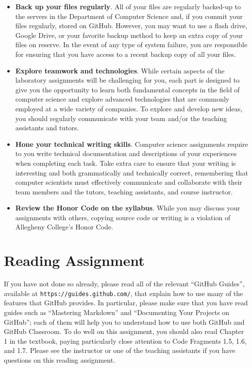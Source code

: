 \documentclass[11pt]{article}
\newcommand{\url}[1]{\lstinline{#1}}
\begin{document}
\begin{itemize}
\item {\bf Back up your files regularly}. All of your files are regularly
  backed-up to the servers in the Department of Computer Science and, if you
  commit your files regularly, stored on GitHub. However, you may want to use a
  flash drive, Google Drive, or your favorite backup method to keep an extra
  copy of your files on reserve. In the event of any type of system failure, you
  are responsible for ensuring that you have access to a recent backup copy of
  all your files.

\item {\bf Explore teamwork and technologies}. While certain aspects of the
  laboratory assignments will be challenging for you, each part is designed to
  give you the opportunity to learn both fundamental concepts in the field of
  computer science and explore advanced technologies that are commonly employed
  at a wide variety of companies. To explore and develop new ideas, you should
  regularly communicate with your team and/or the teaching assistants and
  tutors.

\item {\bf Hone your technical writing skills}. Computer science assignments
  require to you write technical documentation and descriptions of your
  experiences when completing each task. Take extra care to ensure that your
  writing is interesting and both grammatically and technically correct,
  remembering that computer scientists must effectively communicate and
  collaborate with their team members and the tutors, teaching assistants, and
  course instructor.

\item {\bf Review the Honor Code on the syllabus}. While you may discuss your
  assignments with others, copying source code or writing is a violation of
  Allegheny College's Honor Code.

\end{itemize}

\section*{Reading Assignment}

If you have not done so already, please read all of the relevant ``GitHub
Guides'', available at \url{https://guides.github.com/}, that explain how to use
many of the features that GitHub provides. In particular, please make sure that
you have read guides such as ``Mastering Markdown'' and ``Documenting Your
Projects on GitHub''; each of them will help you to understand how to use both
GitHub and GitHub Classroom. To do well on this assignment, you should also read
Chapter 1 in the textbook, paying particularly close attention to Code Fragments
1.5, 1.6, and 1.7. Please see the instructor or one of the teaching assistants
if you have questions on this reading assignment.
\end{document}
